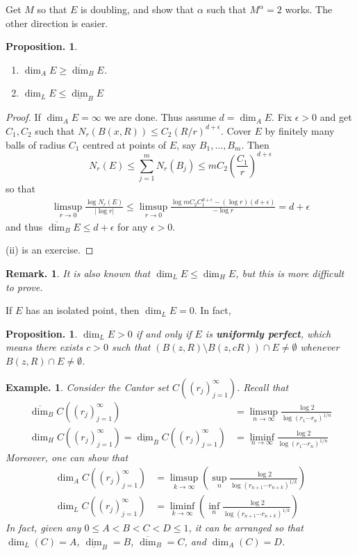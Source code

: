 \documentclass[11pt, a4paper]{memoir}
\theoremstyle{change}
\newtheorem{proposition}[theorem]{Proposition.}
\theoremstyle{plain}
\theoremstyle{nonumberplain}
\newtheorem{example}{Example.}
\newtheorem{remark}{Remark.}
\newtheorem{proof}{Proof}
\newcommand{\defn}[1]{{\boldmath\bfseries #1}}
\numberwithin{equation}{section}
\begin{document}
Get $M$ so that $E$ is doubling, and show that $\alpha$ such that $M^\alpha=2$ works.
The other direction is easier.
\begin{proposition}
    \begin{enumerate}[nl,r]
        \item $\dim_AE\geq\overline{\dim}_B E$.
        \item $\dim_L E\leq\underline{\dim}_B E$
    \end{enumerate}
\end{proposition}
\begin{proof}
    If $\dim_A E=\infty$ we are done.
    Thus assume $d=\dim_A E$.
    Fix $\epsilon>0$ and get $C_1,C_2$ such that $N_r(B(x,R))\leq C_2(R/r)^{d+\epsilon}$.
    Cover $E$ by finitely many balls of radius $C_1$ centred at points of $E$, say $B_1,\ldots,B_m$.
    Then
    \begin{equation*}
        N_r(E)\leq\sum_{j=1}^m N_r(B_j)\leq mC_2\left(\frac{C_1}{r}\right)^{d+\epsilon}
    \end{equation*}
    so that
    \begin{align*}
        \limsup_{r\to 0}\frac{\log N_r(E)}{|\log r|}\leq\limsup_{r\to 0}\frac{\log mC_2C_1^{d+\epsilon}-(\log r)(d+\epsilon)}{-\log r}=d+\epsilon
    \end{align*}
    and thus $\overline{\dim}_B E\leq d+\epsilon$ for any $\epsilon>0$.

    (ii) is an exercise.
\end{proof}
\begin{remark}
    It is also known that $\dim_L E\leq\dim_H E$, but this is more difficult to prove.
\end{remark}
If $E$ has an isolated point, then $\dim_L E=0$.
In fact,
\begin{proposition}
    $\dim_L E>0$ if and only if $E$ is \defn{uniformly perfect}, which means there exists $c>0$ such that $(B(z,R)\setminus B(z,cR))\cap E\neq\emptyset$ whenever $B(z,R)\cap E\neq\emptyset$.
\end{proposition}
\begin{example}
    Consider the Cantor set $C((r_j)_{j=1}^\infty)$.
    Recall that
    \begin{align*}
        \overline{\dim}_BC((r_j)_{j=1}^\infty)&=\limsup_{n\to\infty}\frac{\log 2}{\log(r_1\cdots r_n)^{1/n}}\\
        \dim_H C((r_j)_{j=1}^\infty)=\underline{\dim}_BC((r_j)_{j=1}^\infty)&=\liminf_{n\to\infty}\frac{\log 2}{\log(r_1\cdots r_n)^{1/n}}
    \end{align*}
    Moreover, one can show that
    \begin{align*}
        \dim_A C((r_j)_{j=1}^\infty)&=\limsup_{k\to\infty}\left(\sup_n\frac{\log 2}{\log(r_{n+1}\cdots r_{n+k})^{1/k}}\right)\\
        \dim_L C((r_j)_{j=1}^\infty)&=\liminf_{k\to\infty}\left(\inf_n\frac{\log 2}{\log(r_{n+1}\cdots r_{n+k})^{1/k}}\right)
    \end{align*}
    In fact, given any $0\leq A<B<C<D\leq 1$, it can be arranged so that $\dim_L(C)=A$, $\underline{\dim}_B=B$, $\overline{\dim}_B=C$, and $\dim_A(C)=D$.
\end{example}
\end{document}
